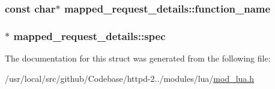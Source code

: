 \subsubsection[{\texorpdfstring{function\+\_\+name}{function_name}}]{\setlength{\rightskip}{0pt plus 5cm}const char$\ast$ mapped\+\_\+request\+\_\+details\+::function\+\_\+name}\hypertarget{structmapped__request__details_af71415be5e31a868c49e36b93b2f251d}{}\label{structmapped__request__details_af71415be5e31a868c49e36b93b2f251d}
\subsubsection[{\texorpdfstring{spec}{spec}}]{$\ast$ mapped\+\_\+request\+\_\+details\+::spec}\hypertarget{structmapped__request__details_a96ff713c7b7d94e5d0da7db0e2eacfc4}{}\label{structmapped__request__details_a96ff713c7b7d94e5d0da7db0e2eacfc4}


The documentation for this struct was generated from the following file\+:\begin{DoxyCompactItemize}
\item 
/usr/local/src/github/\+Codebase/httpd-\/2../modules/lua/\hyperlink{mod__lua_8h}{mod\+\_\+lua.\+h}\end{DoxyCompactItemize}
